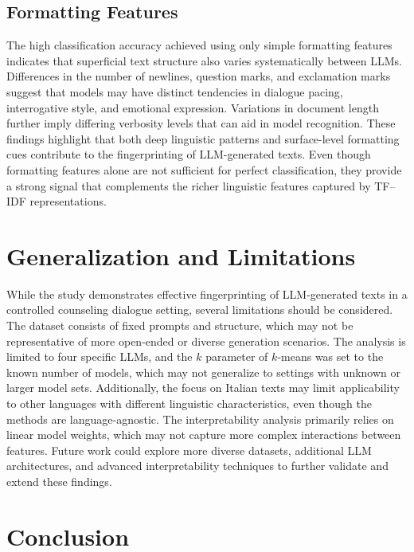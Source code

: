 \documentclass[11pt]{article}
\begin{document}
\subsection{Formatting Features}

The high classification accuracy achieved using only simple formatting features indicates that superficial text structure also varies systematically between LLMs. Differences in the number of newlines, question marks, and exclamation marks suggest that models may have distinct tendencies in dialogue pacing, interrogative style, and emotional expression. Variations in document length further imply differing verbosity levels that can aid in model recognition. These findings highlight that both deep linguistic patterns and surface-level formatting cues contribute to the fingerprinting of LLM-generated texts. Even though formatting features alone are not sufficient for perfect classification, they provide a strong signal that complements the richer linguistic features captured by TF--IDF representations.

\section{Generalization and Limitations}

While the study demonstrates effective fingerprinting of LLM-generated texts in a controlled counseling dialogue setting, several limitations should be considered. The dataset consists of fixed prompts and structure, which may not be representative of more open-ended or diverse generation scenarios. The analysis is limited to four specific LLMs, and the $k$ parameter of $k$-means was set to the known number of models, which may not generalize to settings with unknown or larger model sets. Additionally, the focus on Italian texts may limit applicability to other languages with different linguistic characteristics, even though the methods are language-agnostic. The interpretability analysis primarily relies on linear model weights, which may not capture more complex interactions between features. Future work could explore more diverse datasets, additional LLM architectures, and advanced interpretability techniques to further validate and extend these findings.

\section{Conclusion}
\end{document}
